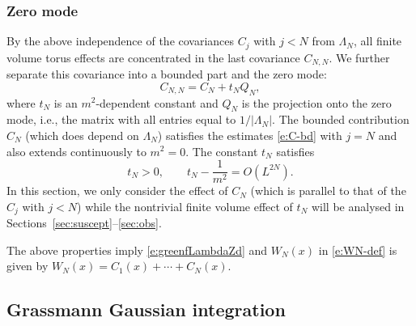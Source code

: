 \documentclass[11pt]{amsart}
\numberwithin{equation}{section}
\numberwithin{theorem}{section}
\newcommand{\1}{{\bf 1}}
\begin{document}
\subsubsection*{Zero mode}
By the above independence of the covariances $C_j$ with $j<N$ from $\Lambda_N$,
all finite volume torus effects are concentrated in the last covariance
$C_{N,N}$. We further separate this covariance into a bounded part and the zero mode:
\begin{equation} \label{e:CNN-def}
  C_{N,N} = C_{N} + t_NQ_N,
\end{equation}
where $t_N$ is an $m^2$-dependent constant
and $Q_N$ is the projection onto the zero mode,
i.e., the matrix with all entries equal to $1/|\Lambda_N|$.
The bounded contribution $C_{N}$
(which does depend on $\Lambda_N$)
satisfies the estimates \eqref{e:C-bd} with $j=N$
and also extends continuously to $m^2=0$.
The constant $t_N$ satisfies 
\begin{equation}
  \label{e:tN}
  t_{N}>0, \qquad t_{N}-\frac{1}{m^{2}} = O(L^{2N}).
\end{equation}
In this section, we only consider the effect of $C_N$
(which is parallel to that of the $C_j$ with $j<N$)
while the nontrivial finite volume effect of $t_N$ will be analysed in Sections~\ref{sec:suscept}--\ref{sec:obs}.

\bigskip
The above properties imply \eqref{e:greenfLambdaZd} and $W_N(x)$
in \eqref{e:WN-def} is given by $W_N(x) = C_1(x) + \cdots + C_N(x)$.


\subsection{Grassmann Gaussian integration}
\label{sec:grassm-gauss-integr}
\end{document}
